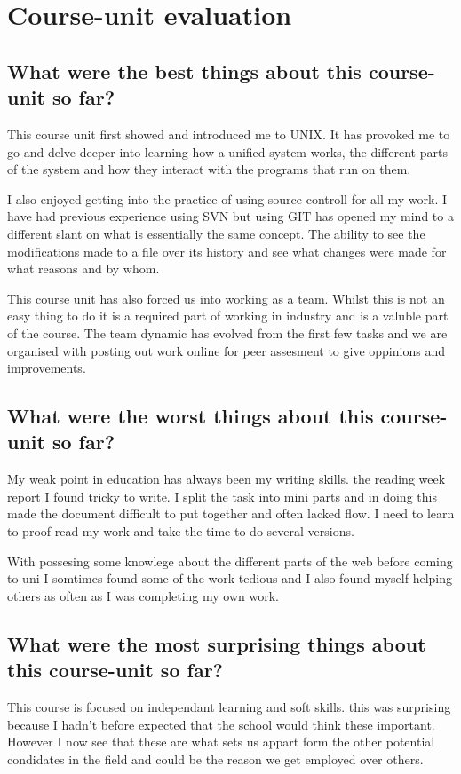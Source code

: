 \documentclass[12pt]{article}
\begin{document}
\maketitle
  \section{Course-unit evaluation}
    \subsection{What were the best things about this course-unit so far?}
      This course unit first showed and introduced me to UNIX. It has provoked
      me to go and delve deeper into learning how a unified system works, the
      different parts of the system and how they interact with the programs
      that run on them.
      
      I also enjoyed getting into the practice of using source controll for 
      all my work. I have had previous experience using SVN but using GIT has
      opened my mind to a different slant on what is essentially the same 
      concept. The ability to see the modifications made to a file over its
      history and see what changes were made for what reasons and by whom.
      
      This course unit has also forced us into working as a team. Whilst this is
      not an easy thing to do it is a required part of working in industry and
      is a valuble part of the course. The team dynamic has evolved from the
      first few tasks and we are organised with posting out work online for peer
      assesment to give oppinions and improvements.
    \subsection{What were the worst things about this course-unit so far?}
      My weak point in education has always been my writing skills. the reading
      week report I found tricky to write. I split the task into mini parts
      and in doing this made the document difficult to put together and often
      lacked flow. I need to learn to proof read my work and take the time to
      do several versions.
      
      With possesing some knowlege about the different parts of the web before
      coming to uni I somtimes found some of the work tedious and I also found
      myself helping others as often as I was completing my own work.
    \subsection{What were the most surprising things about this course-unit so
      far?}
      This course is focused on independant learning and soft skills. this was
      surprising because I hadn't before expected that the school would think
      these important. However I now see that these are what sets us appart form
      the other potential condidates in the field and could be the reason we get
      employed over others.
\end{document}
